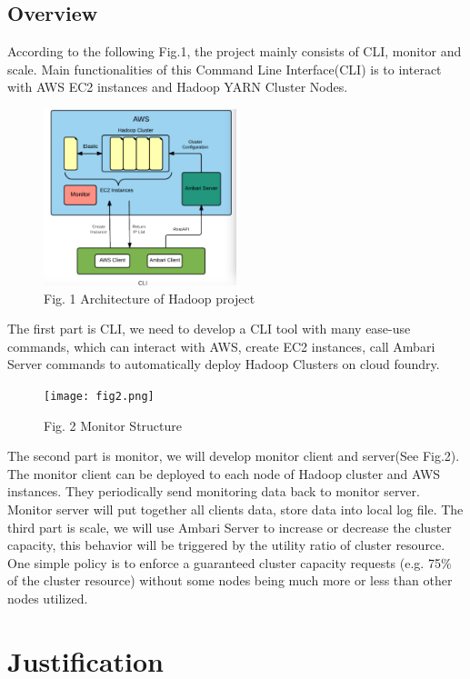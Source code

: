 \documentclass{article}
\begin{document}
\subsection{Overview}
According to the following Fig.1, the project mainly consists of CLI, monitor and scale. Main functionalities of this Command Line Interface(CLI) is to interact with AWS EC2 instances and Hadoop YARN Cluster Nodes.
\begin{figure}[h!]
 \centering
  \includegraphics[width=0.5\textwidth,natwidth=700,natheight=500]{fig1.png}
 \caption{Fig. 1 Architecture of Hadoop project}
 \end{figure}
 The first part is CLI, we need to develop a CLI tool with many ease-use commands, which can interact with AWS, create EC2 instances, call Ambari Server commands to automatically deploy Hadoop Clusters on cloud foundry.
\begin{figure}[h!]
 \centering
  \texttt{[image: fig2.png]}
 \caption{Fig. 2 Monitor Structure}
 \end{figure}
The second part is monitor, we will develop monitor client and server(See Fig.2). The monitor client can be deployed to each node of Hadoop cluster and AWS instances. They periodically send monitoring data back to monitor server. Monitor server will put together all clients data, store data into local log file.
The third part is scale, we will use Ambari Server to increase or decrease the cluster capacity, this behavior will be triggered by the utility ratio of cluster resource. One simple policy is to enforce a guaranteed cluster capacity requests (e.g. 75\% of the cluster resource) without some nodes being much more or less than other nodes utilized.


%
%
\section{Justification}
\end{document}
